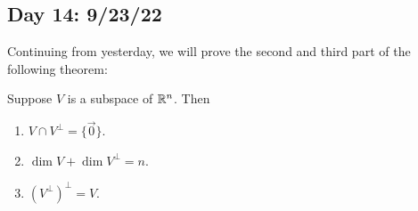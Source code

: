 \documentclass[main.tex]{subfiles}
\begin{document}
\subsection{Day 14: 9/23/22}

Continuing from yesterday, we will prove the second and third part of the following theorem:
\begin{theorem}
    Suppose $V$ is a subspace of $\mathbb R^n$. Then
    \begin{enumerate}
        \item $V \cap V^\perp = \{\vec{0}\}$.
        \item $\dim V + \dim V^\perp = n$.
        \item $(V^\perp)^\perp = V$.
    \end{enumerate}
\end{theorem}
\end{document}
